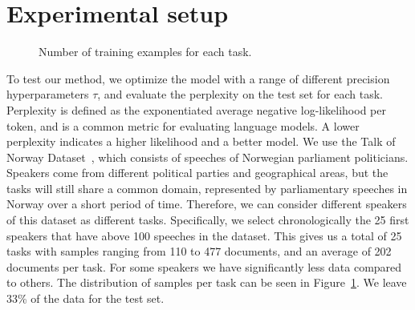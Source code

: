 \documentclass[fullpaper]{nldl}
\begin{document}
\section{Experimental setup} \label{sec:experimental_setup}
\begin{figure} 
    
    \centering
    \caption{Number of training examples for each task.}
    \label{fig:task_len}
\end{figure}
To test our method, we optimize the model with a range of different precision hyperparameters $\tau$, and evaluate the perplexity on the test set for each task.
Perplexity is defined as the exponentiated average negative log-likelihood per token, and is a common metric for evaluating language models. A lower perplexity indicates a higher likelihood and a better model.
We use the Talk of Norway Dataset~\cite{lapponi_talk_2018}, which consists of speeches of Norwegian parliament politicians.
Speakers come from different political parties and geographical areas, but the tasks will still share a common domain, represented by parliamentary speeches in Norway over a short period of time. 
Therefore, we can consider different speakers of this dataset as different tasks. Specifically, we select chronologically the 25 first speakers that have above 100 speeches in the dataset.
This gives us a total of 25 tasks with samples ranging from 110 to 477 documents, and an average of 202 documents per task. For some speakers we have significantly less data compared to others. 
The distribution of samples per task can be seen in Figure~\ref{fig:task_len}.
We leave 33\% of the data for the test set.
\end{document}
